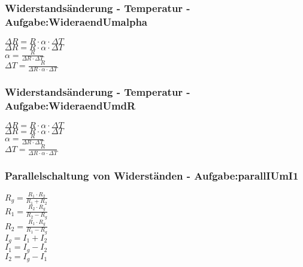 \subsubsection{Widerstandsänderung - Temperatur - Aufgabe:WideraendUmalpha} 
\begin{minipage}{0.45\textwidth} 
$ \Delta R = R\cdot \alpha \cdot \Delta T $\\ 
$ \Delta R = R\cdot \alpha \cdot \Delta T $\\ 
$ \alpha  = \frac{R}{\Delta R\cdot \Delta T} $\\ 
$ \Delta T = \frac{   R}{\Delta R\cdot \alpha \cdot \Delta T} $\\ 
\end{minipage} 
\begin{minipage}{0.45\textwidth} 
 
\end{minipage} 
\subsubsection{Widerstandsänderung - Temperatur - Aufgabe:WideraendUmdR} 
\begin{minipage}{0.45\textwidth} 
$ \Delta R = R\cdot \alpha \cdot \Delta T $\\ 
$ \Delta R = R\cdot \alpha \cdot \Delta T $\\ 
$ \alpha  = \frac{R}{\Delta R\cdot \Delta T} $\\ 
$ \Delta T = \frac{   R}{\Delta R\cdot \alpha \cdot \Delta T} $\\ 
\end{minipage} 
\begin{minipage}{0.45\textwidth} 
 
\end{minipage} 
\subsubsection{Parallelschaltung von Widerständen - Aufgabe:parallIUmI1} 
\begin{minipage}{0.45\textwidth} 
$ R_{g}  = \frac{R_{1} \cdot R_{2} }{R_{1} +R_{2} } $\\ 
$ R_{1}  = \frac{R_{2} \cdot R_{g} }{R_{2} -R_{g} } $\\ 
$ R_{2}  = \frac{R_{1} \cdot R_{g} }{R_{1} -R_{g} } $\\ 
$ I_{g}  = I_{1}  + I_{2} $\\ 
$ I_{1}  = I_{g}  - I_{2} $\\ 
$ I_{2}  = I_{g}  - I_{1} $\\ 
\end{minipage} 
\begin{minipage}{0.45\textwidth} 
 
\end{minipage} 
